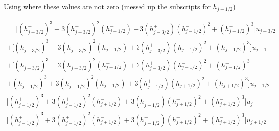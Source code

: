 \documentclass[12pt]{article}
\begin{document}
Using where these values are not zero (messed up the subscripts for $h^-_{j + 1/2}$)

\begin{multline*}
=\bigg[\left(h^+_{j - 3/2}\right)^3 + 3 \left(h^+_{j - 3/2}\right)^2 \left(h^-_{j - 1/2}\right)
+ 3 \left(h^+_{j - 3/2}\right) \left(h^-_{j - 1/2}\right)^2 +  \left(h^-_{j - 1/2}\right)^3  \bigg] u_{j - 3/2} \\
+ \bigg[\left(h^+_{j - 3/2}\right)^3 + 3 \left(h^+_{j - 3/2}\right)^2 \left(h^-_{j - 1/2}\right)
+ 3 \left(h^+_{j - 3/2}\right) \left(h^-_{j - 1/2}\right)^2 +  \left(h^-_{j - 1/2}\right)^3 \bigg] u_{j - 1} \\
+ \bigg[\left(h^+_{j - 3/2}\right)^3 + 3 \left(h^+_{j - 3/2}\right)^2 \left(h^-_{j - 1/2}\right)
+ 3 \left(h^+_{j - 3/2}\right) \left(h^-_{j - 1/2}\right)^2 +  \left(h^-_{j - 1/2}\right)^3 \\ + \left(h^+_{j - 1/2} \right)^3 + 3 \left(h^+_{j - 1/2} \right)^2\left(h^-_{j + 1/2}\right) + 3 \left(h^+_{j - 1/2} \right)\left(h^-_{j + 1/2}\right)^2 + \left(h^-_{j + 1/2}\right)^3 \bigg] u_{j - 1/2} \\
\bigg[\left(h^+_{j - 1/2} \right)^3 + 3 \left(h^+_{j - 1/2} \right)^2\left(h^-_{j + 1/2}\right) + 3 \left(h^+_{j - 1/2} \right)\left(h^-_{j + 1/2}\right)^2 + \left(h^-_{j + 1/2}\right)^3 \bigg] u_{j}\\
\bigg[\left(h^+_{j - 1/2} \right)^3 + 3 \left(h^+_{j - 1/2} \right)^2\left(h^-_{j + 1/2}\right) + 3 \left(h^+_{j - 1/2} \right)\left(h^-_{j + 1/2}\right)^2 + \left(h^-_{j + 1/2}\right)^3 \bigg] u_{j + 1/2}
\end{multline*}
\end{document}
